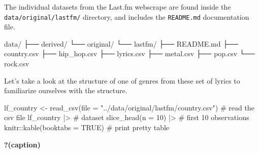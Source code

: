 \documentclass[
  letterpaper,
]{latex/krantz}
\newenvironment{Shaded}{\begin{snugshade}}{\end{snugshade}}
\newcommand{\AttributeTok}[1]{\textcolor[rgb]{0.40,0.45,0.13}{#1}}
\newcommand{\CommentTok}[1]{\textcolor[rgb]{0.37,0.37,0.37}{#1}}
\newcommand{\ConstantTok}[1]{\textcolor[rgb]{0.56,0.35,0.01}{#1}}
\newcommand{\DecValTok}[1]{\textcolor[rgb]{0.68,0.00,0.00}{#1}}
\newcommand{\ExtensionTok}[1]{\textcolor[rgb]{0.00,0.23,0.31}{#1}}
\newcommand{\FunctionTok}[1]{\textcolor[rgb]{0.28,0.35,0.67}{#1}}
\newcommand{\NormalTok}[1]{\textcolor[rgb]{0.00,0.23,0.31}{#1}}
\newcommand{\OtherTok}[1]{\textcolor[rgb]{0.00,0.23,0.31}{#1}}
\newcommand{\SpecialCharTok}[1]{\textcolor[rgb]{0.37,0.37,0.37}{#1}}
\newcommand{\StringTok}[1]{\textcolor[rgb]{0.13,0.47,0.30}{#1}}
\begin{document}
The individual datasets from the Last.fm webscrape are found inside the
\texttt{data/original/lastfm/} directory, and includes the
\texttt{README.md} documentation file.

\begin{Shaded}
\begin{Highlighting}[]
\ExtensionTok{data/}
\ExtensionTok{├──}\NormalTok{ derived/}
\ExtensionTok{└──}\NormalTok{ original/}
    \ExtensionTok{└──}\NormalTok{ lastfm/}
        \ExtensionTok{├──}\NormalTok{ README.md}
        \ExtensionTok{├──}\NormalTok{ country.csv}
        \ExtensionTok{├──}\NormalTok{ hip\_hop.csv}
        \ExtensionTok{├──}\NormalTok{ lyrics.csv}
        \ExtensionTok{├──}\NormalTok{ metal.csv}
        \ExtensionTok{├──}\NormalTok{ pop.csv}
        \ExtensionTok{└──}\NormalTok{ rock.csv}
\end{Highlighting}
\end{Shaded}

Let's take a look at the structure of one of genres from these set of
lyrics to familiarize ourselves with the structure.

\begin{Shaded}
\begin{Highlighting}[]
\NormalTok{lf\_country }\OtherTok{\textless{}{-}} \FunctionTok{read\_csv}\NormalTok{(}\AttributeTok{file =} \StringTok{"../data/original/lastfm/country.csv"}\NormalTok{) }\CommentTok{\# read the csv file}
\NormalTok{lf\_country }\SpecialCharTok{|\textgreater{}} \CommentTok{\# dataset}
  \FunctionTok{slice\_head}\NormalTok{(}\AttributeTok{n =} \DecValTok{10}\NormalTok{) }\SpecialCharTok{|\textgreater{}} \CommentTok{\# first 10 observations }
\NormalTok{knitr}\SpecialCharTok{::}\FunctionTok{kable}\NormalTok{(}\AttributeTok{booktabs =} \ConstantTok{TRUE}\NormalTok{) }\CommentTok{\# print pretty table}
\end{Highlighting}
\end{Shaded}

\begin{table}

\caption{\textbf{?(caption)}}

\end{table}
\end{document}
